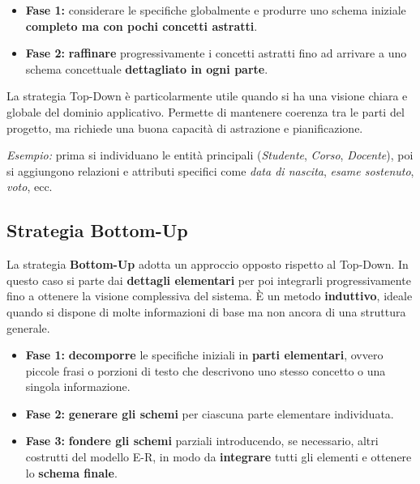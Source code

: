 \begin{itemize}
  \item \textbf{Fase 1:} considerare le specifiche globalmente e produrre uno schema iniziale \textbf{completo ma con pochi concetti astratti}.  
  \item \textbf{Fase 2:} \textbf{raffinare} progressivamente i concetti astratti fino ad arrivare a uno schema concettuale \textbf{dettagliato in ogni parte}.
\end{itemize}

\begin{tcolorbox}[colback=yellow!20,colframe=yellow!50!black,title={\textbf{Nota Bene}},boxrule=0.8pt,arc=2mm]
La strategia Top-Down è particolarmente utile quando si ha una visione chiara e globale del dominio applicativo.  
Permette di mantenere coerenza tra le parti del progetto, ma richiede una buona capacità di astrazione e pianificazione.
\end{tcolorbox}

\begin{center}
\textit{Esempio:} prima si individuano le entità principali (\textit{Studente}, \textit{Corso}, \textit{Docente}), poi si aggiungono relazioni e attributi specifici come \textit{data di nascita}, \textit{esame sostenuto}, \textit{voto}, ecc.
\end{center}

\subsection{Strategia Bottom-Up}

La strategia \textbf{Bottom-Up} adotta un approccio opposto rispetto al Top-Down.  
In questo caso si parte dai \textbf{dettagli elementari} per poi integrarli progressivamente fino a ottenere la visione complessiva del sistema.  
È un metodo \textbf{induttivo}, ideale quando si dispone di molte informazioni di base ma non ancora di una struttura generale.

\begin{itemize}
  \item \textbf{Fase 1:} \textbf{decomporre} le specifiche iniziali in \textbf{parti elementari}, ovvero piccole frasi o porzioni di testo che descrivono uno stesso concetto o una singola informazione.  
  \item \textbf{Fase 2:} \textbf{generare gli schemi} per ciascuna parte elementare individuata.  
  \item \textbf{Fase 3:} \textbf{fondere gli schemi} parziali introducendo, se necessario, altri costrutti del modello E-R, in modo da \textbf{integrare} tutti gli elementi e ottenere lo \textbf{schema finale}.
\end{itemize}

